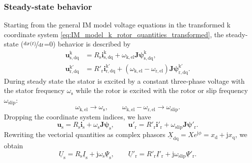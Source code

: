 \begin{frame}
	\frametitle{Steady-state behavior}
    Starting from the general IM model voltage equations in the transformed k coordinate system \eqref{eq:IM_model_k_rotor_quantities_transformed}, the steady-state ($\nicefrac{\mathrm{d}x(t)}{\mathrm{d}t}$=0) behavior is described by
    \begin{equation}
        \begin{alignedat}{2}
            \bm{u}^\mathrm{k}_\mathrm{s,dq} &= R_\mathrm{s} \bm{i}^\mathrm{k}_\mathrm{s,dq} + \omega_\mathrm{k,el}\bm{J} \bm{\psi}^\mathrm{k}_\mathrm{s,dq},\\
            \bm{u}^\mathrm{k'}_\mathrm{r,dq} &= R'_\mathrm{r} \bm{i}^\mathrm{k'}_\mathrm{r,dq} +\left(\omega_\mathrm{k,el}-\omega_\mathrm{r,el}\right)\bm{J}\bm{\psi}^\mathrm{k'}_\mathrm{r,dq}.
        \end{alignedat}
    \end{equation}
    \pause
    During steady state the stator is excited by a constant three-phase voltage with the stator frequency $\omega_\mathrm{s}$ while the rotor is excited with the rotor  or slip frequency $\omega_\mathrm{slip}$:
    \begin{equation}
        \omega_\mathrm{k,el} \rightarrow \omega_\mathrm{s}, \qquad \omega_\mathrm{k,el}-\omega_\mathrm{r,el} \rightarrow \omega_\mathrm{slip}.
    \end{equation}
    \pause Dropping the coordinate system indices, we have
    \begin{equation}
            \bm{u}_\mathrm{s} = R_\mathrm{s} \bm{i}_\mathrm{s} + \omega_\mathrm{s}\bm{J} \bm{\psi}_\mathrm{s},\qquad
            \bm{u}'_\mathrm{r} = R'_\mathrm{r} \bm{i}'_\mathrm{r} +\omega_\mathrm{slip}\bm{J}\bm{\psi}'_\mathrm{r}.
    \end{equation}
    \pause
    Rewriting the vectorial quantities as complex phasors $\underline{X}_\mathrm{dq} = X e^{\mathrm{j}\phi}=x_\mathrm{d} + \mathrm{j} x_\mathrm{q}$, we obtain
    \begin{equation}
            \underline{U}_\mathrm{s} = R_\mathrm{s} \underline{I}_\mathrm{s} + \mathrm{j}\omega_\mathrm{s}\underline{\Psi}_\mathrm{s},\qquad
            \underline{U}'_\mathrm{r} = R'_\mathrm{r} \underline{I}'_\mathrm{r} +\mathrm{j}\omega_\mathrm{slip}\underline{\Psi}'_\mathrm{r}.
        \label{eq:IM_model_voltage_equations_steady_state}
    \end{equation}
\end{frame}

